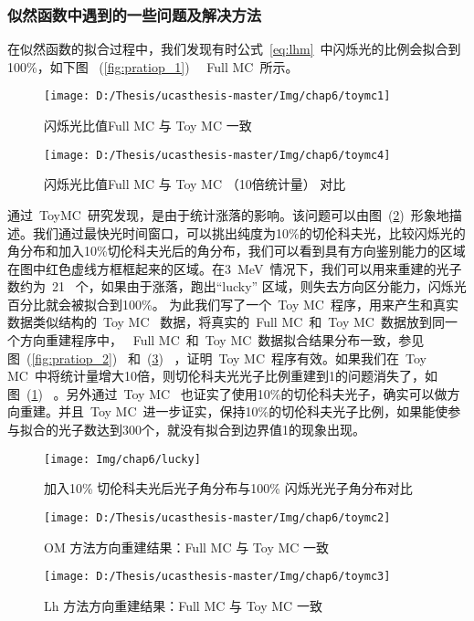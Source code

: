 \subsubsection{似然函数中遇到的一些问题及解决方法}
在似然函数的拟合过程中，我们发现有时公式~\ref{eq:lhm}~中闪烁光的比例会拟合到100\%，如下图
~(\ref{fig:pratiop_1})~ ~Full MC~所示。
\begin{figure}[!htb]
\begin{minipage}[t]{0.48\linewidth}
  \centering
     \texttt{[image: D:/Thesis/ucasthesis-master/Img/chap6/toymc1]}
    \caption{ 闪烁光比值Full MC 与 Toy MC 一致}
    \label{fig:pratiop_1}
  \end{minipage}%
  \quad\quad
  \begin{minipage}[t]{0.48\linewidth}
  \centering
    \texttt{[image: D:/Thesis/ucasthesis-master/Img/chap6/toymc4]}
    \caption{ 闪烁光比值Full MC 与 Toy MC （10倍统计量） 对比 }
    \label{fig:pratiop_4}
  \end{minipage}
  \end{figure}
通过~ToyMC~研究发现，是由于统计涨落的影响。该问题可以由图~(\ref{fig:lucky})~形象地描述。我们通过最快光时间窗口，可以挑出纯度为10\%的切伦科夫光，比较闪烁光的角分布和加入10\%切伦科夫光后的角分布，我们可以看到具有方向鉴别能力的区域在图中红色虚线方框框起来的区域。在3~MeV~情况下，我们可以用来重建的光子数约为~21~ 个，如果由于涨落，跑出``lucky'' 区域，则失去方向区分能力，闪烁光百分比就会被拟合到100\%。 为此我们写了一个~Toy MC~程序，用来产生和真实数据类似结构的~Toy MC~ 数据，将真实的~Full MC~和~Toy MC~数据放到同一个方向重建程序中，
~Full MC~和~Toy MC~数据拟合结果分布一致，参见图~(\ref{fig:pratiop_2}) ~和~(\ref{fig:pratiop_3}) ~，证明~Toy MC~程序有效。如果我们在~Toy MC~中将统计量增大10倍，则切伦科夫光光子比例重建到1的问题消失了，如图~(\ref{fig:pratiop_4}) ~。另外通过~Toy MC~ 也证实了使用10\%的切伦科夫光子，确实可以做方向重建。并且~Toy MC~进一步证实，保持10\%的切伦科夫光子比例，如果能使参与拟合的光子数达到300个，就没有拟合到边界值1的现象出现。\\
\begin{figure}[!htbp]
  \centering
   \texttt{[image: Img/chap6/lucky]}
    \caption{加入10\% 切伦科夫光后光子角分布与100\% 闪烁光光子角分布对比}
  \label{fig:lucky}
\end{figure}
\begin{figure}[!htb]
\begin{minipage}[t]{0.48\linewidth}
  \centering
     \texttt{[image: D:/Thesis/ucasthesis-master/Img/chap6/toymc2]}
    \caption{ OM 方法方向重建结果：Full MC 与 Toy MC 一致}
    \label{fig:pratiop_2}
  \end{minipage}%
  \quad\quad
  \begin{minipage}[t]{0.48\linewidth}
  \centering
    \texttt{[image: D:/Thesis/ucasthesis-master/Img/chap6/toymc3]}
    \caption{ Lh 方法方向重建结果：Full MC 与 Toy MC 一致 }
    \label{fig:pratiop_3}
  \end{minipage}
  \end{figure}
